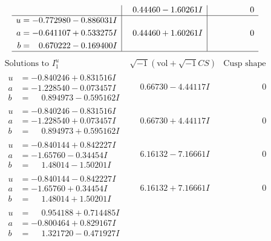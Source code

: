 \documentclass[1p]{elsarticle_modified}
\theoremstyle{definition}
\newcommand{\I}{\sqrt{-1}}
\begin{document}
$$\begin{array}{c|c|c}
 & \phantom{-}0.44460 - 1.60261 I & \phantom{-0.000000 } 0 \\ \hline\begin{aligned}
u &= -0.772980 - 0.886031 I \\
a &= -0.641107 + 0.533275 I \\
b &= \phantom{-}0.670222 - 0.169400 I\end{aligned}
 & \phantom{-}0.44460 + 1.60261 I & \phantom{-0.000000 } 0\\
 \hline 
 \end{array}$$\newpage$$\begin{array}{c|c|c}  
\text{Solutions to }I^u_{1}& \I (\text{vol} + \sqrt{-1}CS) & \text{Cusp shape}\\
 \hline 
\begin{aligned}
u &= -0.840246 + 0.831516 I \\
a &= -1.228540 - 0.073457 I \\
b &= \phantom{-}0.894973 - 0.595162 I\end{aligned}
 & \phantom{-}0.66730 - 4.44117 I & \phantom{-0.000000 } 0 \\ \hline\begin{aligned}
u &= -0.840246 - 0.831516 I \\
a &= -1.228540 + 0.073457 I \\
b &= \phantom{-}0.894973 + 0.595162 I\end{aligned}
 & \phantom{-}0.66730 + 4.44117 I & \phantom{-0.000000 } 0 \\ \hline\begin{aligned}
u &= -0.840144 + 0.842227 I \\
a &= -1.65760 - 0.34454 I \\
b &= \phantom{-}1.48014 - 1.50201 I\end{aligned}
 & \phantom{-}6.16132 - 7.16661 I & \phantom{-0.000000 } 0 \\ \hline\begin{aligned}
u &= -0.840144 - 0.842227 I \\
a &= -1.65760 + 0.34454 I \\
b &= \phantom{-}1.48014 + 1.50201 I\end{aligned}
 & \phantom{-}6.16132 + 7.16661 I & \phantom{-0.000000 } 0 \\ \hline\begin{aligned}
u &= \phantom{-}0.954188 + 0.714485 I \\
a &= -0.800464 + 0.829167 I \\
b &= \phantom{-}1.321720 - 0.471927 I\end{aligned}

\end{array}$$
\end{document}
